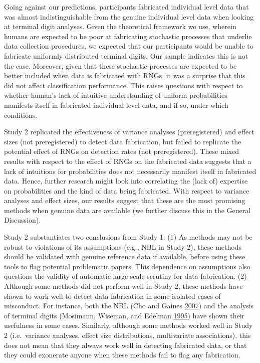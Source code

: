 \documentclass[a5paper]{book}
\begin{document}
Going against our predictions, participants fabricated individual level
data that was almost indistinguishable from the genuine individual level
data when looking at terminal digit analyses. Given the theoretical
framework we use, wherein humans are expected to be poor at fabricating
stochastic processes that underlie data collection procedures, we
expected that our participants would be unable to fabricate uniformly
distributed terminal digits. Our sample indicates this is not the case.
Moreover, given that these stochastic processes are expected to be
better included when data is fabricated with RNGs, it was a surprise
that this did not affect classification performance. This raises
questions with respect to whether human's lack of intuitive
understanding of uniform probabilities manifests itself in fabricated
individual level data, and if so, under which conditions.

Study 2 replicated the effectiveness of variance analyses
(preregistered) and effect sizes (not preregistered) to detect data
fabrication, but failed to replicate the potential effect of RNGs on
detection rates (not preregistered). These mixed results with respect to
the effect of RNGs on the fabricated data suggests that a lack of
intuitions for probabilities does not necessarily manifest itself in
fabricated data. Hence, further research might look into correlating the
(lack of) expertise on probabilities and the kind of data being
fabricated. With respect to variance analyses and effect sizes, our
results suggest that these are the most promising methods when genuine
data are available (we further discuss this in the General Discussion).

Study 2 substantiates two conclusions from Study 1: (1) As methods may
not be robust to violations of its assumptions (e.g., NBL in Study 2),
these methods should be validated with genuine reference data if
available, before using these tools to flag potential problematic
papers. This dependence on assumptions also questions the validity of
automatic large-scale scrutiny for data fabrication. (2) Although some
methods did not perform well in Study 2, these methods have shown to
work well to detect data fabrication in some isolated cases of
misconduct. For instance, both the NBL (Cho and Gaines
\protect\hyperlink{ref-doi:10.2307ux2f27643897}{2007}) and the analysis
of terminal digits (Mosimann, Wiseman, and Edelman
\protect\hyperlink{ref-doi:10.1080ux2f08989629508573866}{1995}) have
shown their usefulness in some cases. Similarly, although some methods
worked well in Study 2 (i.e.~variance analyses, effect size
distributions, multivariate associations), this does not mean that they
always work well in detecting fabricated data, or that they could
exonerate anyone when these methods fail to flag any fabrication.
\end{document}
